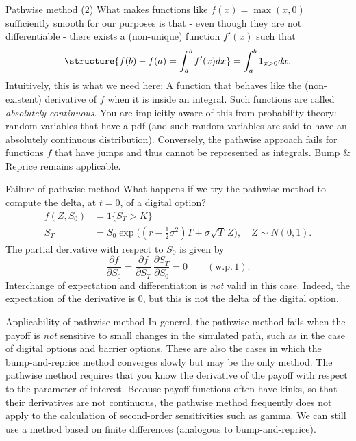 \documentclass[pdf, handout]{beamer}
\begin{document}
\begin{frame}{Pathwise method (2)}
What makes functions like $f(x)=\max(x,0)$ sufficiently smooth for our purposes is that - even though they are not differentiable - there exists a (non-unique) function $f'(x)$
such that
\[
\structure{f(b)-f(a)=\int_a^b f'(x) dx} = \int_a^b 1_{x>0} dx.
\]
Intuitively, this is what we need here: A function that behaves like the (non-existent) derivative of $f$ when it is inside an integral.
Such functions are called \emph{absolutely continuous}.
You are implicitly aware of this from probability theory:
random variables that have a pdf (and such random variables are said to have an absolutely continuous distribution).
\vskip2mm
Conversely, the pathwise approach fails for functions $f$ that have jumps and thus cannot be represented as integrals. Bump \& Reprice remains applicable. 
\end{frame}

\begin{frame}{Failure of pathwise method}
What happens if we try the pathwise method to compute the delta, at $t=0$, of a digital option?
\begin{align*}
f(Z,S_0) & = 1\{S_T>K\} \\
S_T & = S_0\exp\!\big((r-\tfrac{1}{2}\sigma^2)T + \sigma \sqrt{T} \,Z\big),
\quad Z \sim N(0,1).
\end{align*}
\vskip2mm\pause
The partial derivative with respect to $S_0$ is given by
$$
\frac{\partial f}{\partial S_0} = \frac{\partial f}{ \partial S_T}\, \frac{\partial S_T}{\partial S_0} =
0 \qquad (\text{w.p.}\,1).
$$
\vskip4mm\pause
Interchange of expectation and differentiation is \emph{not} valid in this case. Indeed,
the expectation of the derivative is $0$, but this is not the delta of the digital option.
\end{frame}



\begin{frame}{Applicability of pathwise method}
In general, the pathwise method fails when the payoff is \emph{not} sensitive to small changes
in the simulated path, such as in the case of digital options and barrier options. These are
also the cases in which the bump-and-reprice method converges slowly but may be the only method.
\vskip4mm\pause
The pathwise method requires that you know the derivative of the payoff with respect to
the parameter of interest. %
\vskip4mm\pause
Because payoff functions often have kinks, so that their derivatives are not continuous,
the pathwise method frequently does not apply to the calculation of second-order sensitivities 
such as gamma. We can still use a method based on finite differences (analogous to bump-and-reprice).
\end{frame}
\end{document}
